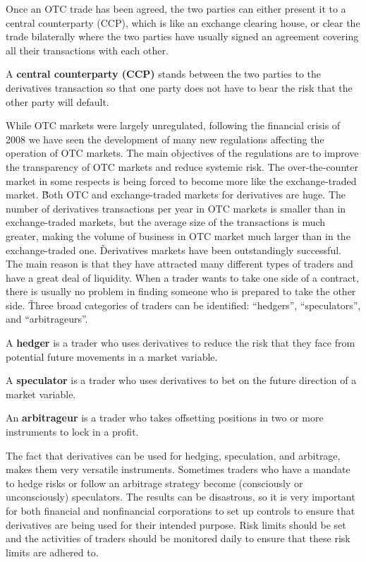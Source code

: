 Once an OTC trade has been agreed, the two parties can either present it to a central counterparty (CCP), which is like
an exchange clearing house, or clear the trade bilaterally where the two parties have usually signed an agreement
covering all their transactions with each other.

A \textbf{central counterparty (CCP)} stands between the two parties to the derivatives transaction so that one party
does not have to bear the risk that the other party will default.
\ed

While OTC markets were largely unregulated, following the financial crisis of 2008 we have seen the development of
many new regulations affecting the operation of OTC markets. The main objectives of the regulations are to improve
the transparency of OTC markets and reduce systemic risk. The over-the-counter market in some respects is being forced
to become more like the exchange-traded market. \v

Both OTC and exchange-traded markets for derivatives are huge. The number of derivatives transactions per year in OTC
markets is smaller than in exchange-traded markets, but the average size of the transactions is much greater, making the
volume of business in OTC market much larger than in the exchange-traded one. \v

Derivatives markets have been outstandingly successful. The main reason is that they have attracted many different
types of traders and have a great deal of liquidity. When a trader wants to take one side of a contract,
there is usually no problem in finding someone who is prepared to take the other side. \v

Three broad categories of traders can be identified: ``hedgers'', ``speculators'', and ``arbitrageurs''.

\bd[Hedger]
A \textbf{hedger} is a trader who uses derivatives to reduce the risk that they face from potential future movements in
a market variable.
\ed

\bd[Speculator]
A \textbf{speculator} is a trader who uses derivatives to bet on the future direction of a market variable.
\ed

\bd[Arbitrageur]
An \textbf{arbitrageur} is a trader who takes offsetting positions in two or more instruments to lock in a profit.
\ed

The fact that derivatives can be used for hedging, speculation, and arbitrage, makes them very versatile instruments.
Sometimes traders who have a mandate to hedge risks or follow an arbitrage strategy become (consciously or
unconsciously) speculators. The results can be disastrous, so it is very important for both financial and
nonfinancial corporations to set up controls to ensure that derivatives are being used for their intended purpose.
Risk limits should be set and the activities of traders should be monitored daily to ensure that these risk limits
are adhered to.

